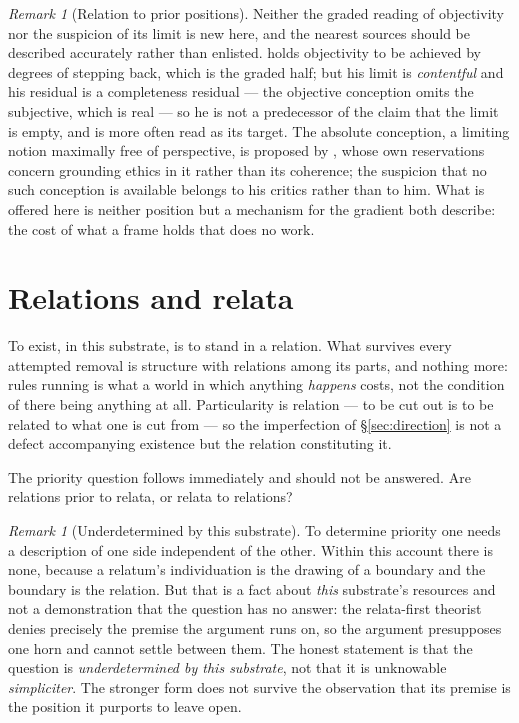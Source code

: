 \documentclass[11pt,a4paper]{article}
\theoremstyle{remark}\newtheorem{remark}[definition]{Remark}
\begin{document}
\begin{remark}[Relation to prior positions]\label{rem:nowhere-prior}
Neither the graded reading of objectivity nor the suspicion of its limit is new here, and the nearest
sources should be described accurately rather than enlisted. \citet{nagel1986} holds objectivity to be
achieved by degrees of stepping back, which is the graded half; but his limit is \emph{contentful} and
his residual is a completeness residual --- the objective conception omits the subjective, which is
real --- so he is not a predecessor of the claim that the limit is empty, and is more often read as
its target. The absolute conception, a limiting notion maximally free of perspective, is proposed by
\citet{williams1978}, whose own reservations concern grounding ethics in it rather than its
coherence; the suspicion that no such conception is available belongs to his critics rather than to
him. What is offered here is neither position but a mechanism for the gradient both describe: the
cost of what a frame holds that does no work.
\end{remark}

\section{Relations and relata}\label{sec:relation}

To exist, in this substrate, is to stand in a relation. What survives every attempted removal is
structure with relations among its parts, and nothing more: rules running is what a world
in which anything \emph{happens} costs, not the condition of there being anything at all. Particularity is relation --- to
be cut out is to be related to what one is cut from --- so the imperfection of \S\ref{sec:direction}
is not a defect accompanying existence but the relation constituting it.

The priority question follows immediately and should not be answered. Are relations prior to relata,
or relata to relations?

\begin{remark}[Underdetermined by this substrate]\label{rem:underdetermined}
To determine priority one needs a description of one side independent of the other. Within this
account there is none, because a relatum's individuation is the drawing of a boundary and the
boundary is the relation. But that is a fact about \emph{this} substrate's resources and not a
demonstration that the question has no answer: the relata-first theorist denies precisely the premise
the argument runs on, so the argument presupposes one horn and cannot settle between them. The honest
statement is that the question is \emph{underdetermined by this substrate}, not that it is unknowable
\emph{simpliciter}. The stronger form does not survive the observation that its premise is the position it purports to leave open.
\end{remark}
\end{document}
